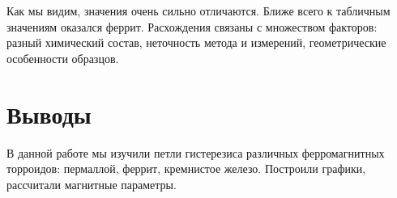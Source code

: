 \documentclass[a4paper]{article}
\begin{document}
Как мы видим, значения очень сильно отличаются. Ближе всего к табличным значениям оказался феррит. Расхождения связаны с множеством факторов: разный химический состав, неточность метода и измерений, геометрические особенности образцов.

\section{Выводы}
В данной работе мы изучили петли гистерезиса различных ферромагнитных торроидов: пермаллой, феррит, кремнистое железо. Построили графики, рассчитали магнитные параметры.
\end{document}
